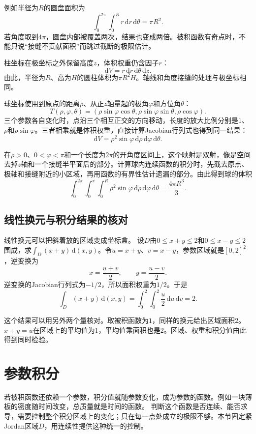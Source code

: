 例如半径为$R$的圆盘面积为
\[
 \int_0^{2\pi}\int_0^R r\,\mathrm dr\,\mathrm d\theta=\pi R^2.
\]
若角度取到$4\pi$，圆盘内部被覆盖两次，结果也变成两倍。被积函数有奇点时，不能只说“接缝不贡献面积”而跳过截断的极限估计。

柱坐标在极坐标之外保留高度$z$，体积权重仍含因子$r$：
\[
 \mathrm dV=r\,\mathrm dr\,\mathrm d\theta\,\mathrm dz.
\]
由此，半径为$R$、高为$H$的圆柱体积为$\pi R^2H$。轴线和角度接缝的处理与极坐标相同。

球坐标使用到原点的距离$\rho$、从正$z$轴量起的极角$\varphi$和方位角$\theta$：
\[
 T(\rho,\varphi,\theta)
 =(\rho\sin\varphi\cos\theta,\rho\sin\varphi\sin\theta,\rho\cos\varphi).
\]
三个参数各自变化时，点沿三个相互正交的方向移动，长度的放大比例分别是$1$、$\rho$和$\rho\sin\varphi$。三者相乘就是体积权重，直接计算Jacobian行列式也得到同一结果：
\[
 \mathrm dV=\rho^2\sin\varphi\,\mathrm d\rho\,\mathrm d\varphi\,\mathrm d\theta.
\]

在$\rho>0$、$0<\varphi<\pi$和一个长度为$2\pi$的开角度区间上，这个映射是双射，像是空间去掉$z$轴和一个接缝半平面后的部分。计算球内连续函数的积分时，先截去原点、极轴和接缝附近的小区域，再用函数的有界性估计遗漏的部分。由此得到球的体积
\[
 \int_0^{2\pi}\int_0^\pi\int_0^R
 \rho^2\sin\varphi\,\mathrm d\rho\,\mathrm d\varphi\,\mathrm d\theta
 =\frac{4\pi R^3}{3}.
\]

\subsection{线性换元与积分结果的核对}

线性换元可以把斜着放的区域变成坐标盒。
设$D$由$0\leq x+y\leq2$和$0\leq x-y\leq2$围成，求$\int_D(x+y)\,\mathrm d(x,y)$。令$u=x+y$、$v=x-y$，参数区域就是$[0,2]^2$，逆变换为
\[
 x=\frac{u+v}2,\qquad y=\frac{u-v}2.
\]
逆变换的Jacobian行列式为$-1/2$，所以面积权重为$1/2$。于是
\[
 \int_D(x+y)\,\mathrm d(x,y)
 =\int_0^2\int_0^2\frac u2\,\mathrm du\,\mathrm dv=2.
\]

这个结果可以用另外两个量核对。取被积函数为$1$，同样的换元给出区域面积$2$。$x+y=u$在区域上的平均值为$1$，平均值乘面积也是$2$。区域、权重和积分值由此得到同时检验。

\section{参数积分}

若被积函数还依赖一个参数，积分值就随参数变化，成为参数的函数。例如一块薄板的密度随时间改变，总质量就是时间的函数。
判断这个函数是否连续、能否求导，需要控制整个积分区域上的变化；只在每一点处成立的极限不够。本节固定紧Jordan区域$D$，用连续性提供这种统一的控制。

